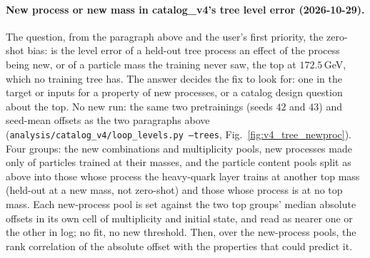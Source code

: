 \documentclass[11pt]{article}
\newcommand{\code}[1]{\texttt{#1}}
\begin{document}
\paragraph{New process or new mass in catalog\_v4's tree level error (2026-10-29).}\label{par:v4_tree_newproc} The
question, from the paragraph above and the user's first priority, the zero-shot bias: is the level error of a held-out
tree process an effect of the process being new, or of a particle mass the training never saw, the top at
$172.5$\,GeV, which no training tree has. The answer decides the fix to look for: one in the target or inputs for a
property of new processes, or a catalog design question about the top. No new run: the same two pretrainings (seeds
$42$ and $43$) and seed-mean offsets as the two paragraphs above (\code{analysis/catalog\_v4/loop\_levels.py
--trees}, Fig.~\ref{fig:v4_tree_newproc}). Four groups: the new combinations and multiplicity pools, new processes
made only of particles trained at their masses, and the particle content pools split as above into those whose
process the heavy-quark layer trains at another top mass (held-out at a new mass, not zero-shot) and those whose process is at no top mass. Each new-process
pool is set against the two top groups' median absolute offsets in its own cell of multiplicity and initial state,
and read as nearer one or the other in log; no fit, no new threshold. Then, over the new-process pools, the rank
correlation of the absolute offset with the properties that could predict it.
\end{document}
